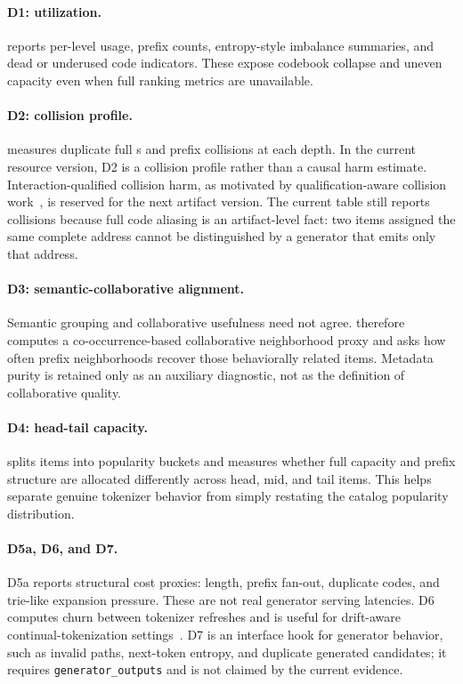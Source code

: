 \paragraph{D1: utilization.}
\tool reports per-level usage, prefix counts, entropy-style imbalance
summaries, and dead or underused code indicators. These expose codebook
collapse and uneven capacity even when full ranking metrics are unavailable.

\paragraph{D2: collision profile.}
\tool measures duplicate full \sid{}s and prefix collisions at each depth. In
the current resource version, D2 is a collision profile rather than a causal
harm estimate. Interaction-qualified collision harm, as motivated by
qualification-aware collision work~\cite{hu2026quasid}, is reserved for the
next artifact version. The current table still reports collisions because full
code aliasing is an artifact-level fact: two items assigned the same complete
address cannot be distinguished by a generator that emits only that address.

\paragraph{D3: semantic-collaborative alignment.}
Semantic grouping and collaborative usefulness need not agree. \tool therefore
computes a co-occurrence-based collaborative neighborhood proxy and asks how
often prefix neighborhoods recover those behaviorally related items. Metadata
purity is retained only as an auxiliary diagnostic, not as the definition of
collaborative quality.

\paragraph{D4: head-tail capacity.}
\tool splits items into popularity buckets and measures whether full \sid
capacity and prefix structure are allocated differently across head, mid, and
tail items. This helps separate genuine tokenizer behavior from simply
restating the catalog popularity distribution.

\paragraph{D5a, D6, and D7.}
D5a reports structural cost proxies: \sid length, prefix fan-out, duplicate
codes, and trie-like expansion pressure. These are not real generator serving
latencies. D6 computes churn between tokenizer refreshes and is useful for
drift-aware continual-tokenization settings~\cite{feng2026dact}. D7 is an
interface hook for generator behavior, such as invalid paths, next-token
entropy, and duplicate generated candidates; it requires
\texttt{generator\_outputs} and is not claimed by the current evidence.

